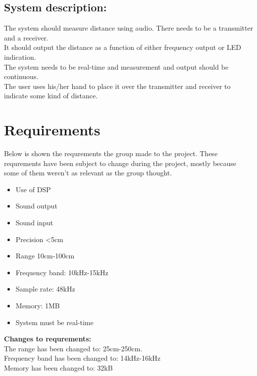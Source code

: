\subsection{System description:}
The system should measure distance using audio. There needs to be a transmitter and a receiver.\\
It should output the distance as a function of either frequency output or LED indication.\\
The system needs to be real-time and measurement and output should be continuous.\\
The user uses his/her hand to place it over the transmitter and receiver to indicate some kind of distance.\\


\section{Requirements}
Below is shown the requrements the group made to the project. These requrements have been subject to change during the project, mostly because some of them weren't as relevant as the group thought.
\begin{itemize}
\item Use of DSP
\item Sound output
\item Sound input
\item Precision <5cm
\item Range 10cm-100cm
\item Frequency band: 10kHz-15kHz
\item Sample rate: 48kHz
\item Memory: 1MB
\item System must be real-time
\end{itemize}
\textbf{Changes to requrements:}\\
The range has been changed to: 25cm-250cm.\\
Frequency band has been changed to: 14kHz-16kHz\\
Memory has been changed to: 32kB\\

